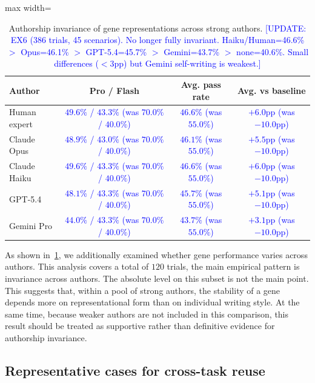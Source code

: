 \documentclass{article}
\newcommand{\blue}[1]{\textcolor{blue}{#1}}
\begin{document}
\begin{table}[h]
\centering
\caption{Authorship invariance of gene representations across strong authors. \blue{[UPDATE: EX6 (386 trials, 45 scenarios). No longer fully invariant. Haiku/Human=46.6\% $>$ Opus=46.1\% $>$ GPT-5.4=45.7\% $>$ Gemini=43.7\% $>$ none=40.6\%. Small differences ($<$3pp) but Gemini self-writing is weakest.]}}
\label{tab:gene_authors}
\begin{adjustbox}{max width=\textwidth}
\begin{tabular}{lccc}
\toprule
\textbf{Author} & \textbf{Pro / Flash} & \textbf{Avg. pass rate} & \textbf{Avg. vs baseline} \\
\midrule
Human expert & \blue{$49.6\%$ / $43.3\%$ (was $70.0\%$ / $40.0\%$)} & \blue{$46.6\%$ (was $55.0\%$)} & \blue{$+6.0$pp (was $-10.0$pp)} \\
Claude Opus & \blue{$48.9\%$ / $43.0\%$ (was $70.0\%$ / $40.0\%$)} & \blue{$46.1\%$ (was $55.0\%$)} & \blue{$+5.5$pp (was $-10.0$pp)} \\
Claude Haiku & \blue{$49.6\%$ / $43.3\%$ (was $70.0\%$ / $40.0\%$)} & \blue{$46.6\%$ (was $55.0\%$)} & \blue{$+6.0$pp (was $-10.0$pp)} \\
GPT-5.4 & \blue{$48.1\%$ / $43.3\%$ (was $70.0\%$ / $40.0\%$)} & \blue{$45.7\%$ (was $55.0\%$)} & \blue{$+5.1$pp (was $-10.0$pp)} \\
Gemini Pro & \blue{$44.0\%$ / $43.3\%$ (was $70.0\%$ / $40.0\%$)} & \blue{$43.7\%$ (was $55.0\%$)} & \blue{$+3.1$pp (was $-10.0$pp)} \\
\bottomrule
\end{tabular}
\end{adjustbox}
\end{table}


As shown in~\cref{tab:gene_authors}, we additionally examined whether gene performance varies across authors.
This analysis covers a total of $120$ trials, the main empirical pattern is invariance across authors.
The absolute level on this subset is not the main point.
This suggests that, within a pool of strong authors, the stability of a gene depends more on representational form than on individual writing style.
At the same time, because weaker authors are not included in this comparison, this result should be treated as supportive rather than definitive evidence for authorship invariance.


\subsection{Representative cases for cross-task reuse}
\label{app:gene_reuse_cases}
\end{document}
